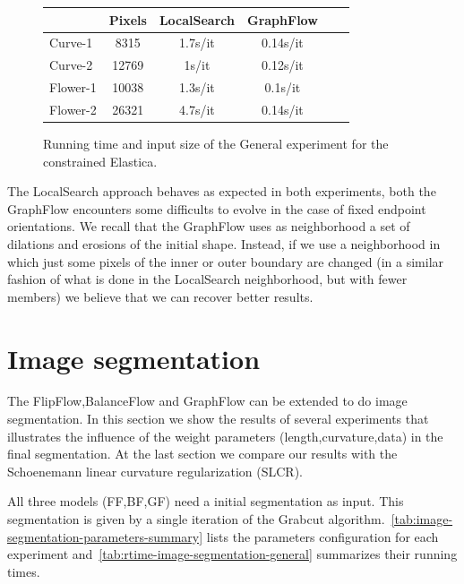 \begin{figure}
\center
\captionsetup{type=table}
\begin{tabular}{|l|c|c|c|c|c|}
\hline
& Pixels & LocalSearch & GraphFlow \\
\hline
Curve-1 & 8315 & 1.7s/it & 0.14s/it\\
Curve-2 & 12769 & 1s/it & 0.12s/it\\
Flower-1  & 10038 & 1.3s/it & 0.1s/it \\
Flower-2 & 26321 & 4.7s/it & 0.14s/it\\
\hline
\end{tabular}
\caption{Running time and input size of the General experiment for the constrained Elastica.}
\label{tab:rtime-constrained-elastica-general} 
\end{figure}


The LocalSearch approach behaves as expected in both experiments, both the GraphFlow encounters some difficults to evolve in the case of fixed endpoint orientations. We recall that the GraphFlow uses as neighborhood a set of dilations and erosions of the initial shape. Instead, if we use a neighborhood in which just some pixels of the inner or outer boundary are changed (in a similar fashion of what is done in the LocalSearch neighborhood, but with fewer members) we believe that we can recover better results.

\section{Image segmentation}

The FlipFlow,BalanceFlow and GraphFlow can be extended to do image segmentation. In this section we show the results of several experiments that illustrates the influence of the weight parameters (length,curvature,data) in the final segmentation. At the last section we compare our results with the Schoenemann linear curvature regularization (SLCR). 

All three models (FF,BF,GF) need a initial segmentation as input. This segmentation is given by a single iteration of the Grabcut algorithm.~\cref{tab:image-segmentation-parameters-summary} lists the parameters configuration for each experiment and~\cref{tab:rtime-image-segmentation-general} summarizes their running times. 

